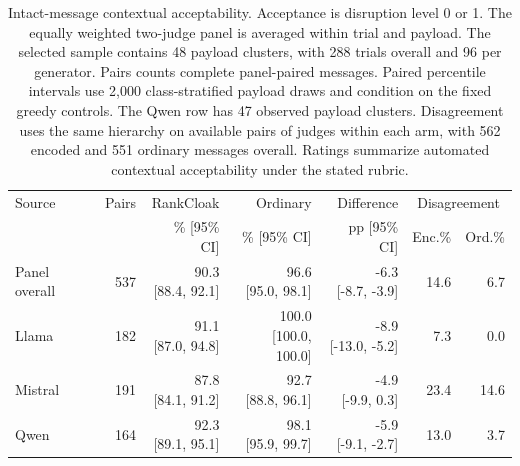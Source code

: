 \documentclass[fleqn,10pt]{wlscirep}
\begin{document}
\begin{table}[H]\centering\small
\begin{tabular}{lrrrrrr}\toprule
Source & Pairs & RankCloak & Ordinary & Difference & \multicolumn{2}{c}{Disagreement}\\
 & & \% [95\% CI] & \% [95\% CI] & pp [95\% CI] & Enc.\% & Ord.\%\\\midrule
Panel overall & 537 & \shortstack{90.3\\{}[88.4, 92.1]} & \shortstack{96.6\\{}[95.0, 98.1]} & \shortstack{-6.3\\{}[-8.7, -3.9]} & 14.6 & 6.7\\
Llama & 182 & \shortstack{91.1\\{}[87.0, 94.8]} & \shortstack{100.0\\{}[100.0, 100.0]} & \shortstack{-8.9\\{}[-13.0, -5.2]} & 7.3 & 0.0\\
Mistral & 191 & \shortstack{87.8\\{}[84.1, 91.2]} & \shortstack{92.7\\{}[88.8, 96.1]} & \shortstack{-4.9\\{}[-9.9, 0.3]} & 23.4 & 14.6\\
Qwen & 164 & \shortstack{92.3\\{}[89.1, 95.1]} & \shortstack{98.1\\{}[95.9, 99.7]} & \shortstack{-5.9\\{}[-9.1, -2.7]} & 13.0 & 3.7\\
\bottomrule\end{tabular}
\caption{Intact-message contextual acceptability. Acceptance is disruption level 0 or 1. The equally weighted two-judge panel is averaged within trial and payload. The selected sample contains 48 payload clusters, with 288 trials overall and 96 per generator. Pairs counts complete panel-paired messages. Paired percentile intervals use 2,000 class-stratified payload draws and condition on the fixed greedy controls. The Qwen row has 47 observed payload clusters. Disagreement uses the same hierarchy on available pairs of judges within each arm, with 562 encoded and 551 ordinary messages overall. Ratings summarize automated contextual acceptability under the stated rubric.}\label{tab:v4-contextual}
\end{table}
\end{document}
